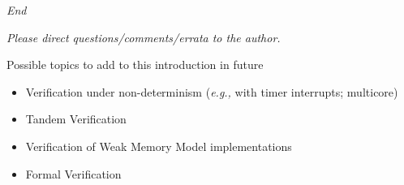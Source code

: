 \documentclass{article}
\newcommand{\eg}{\emph{e.g.,}}
\begin{document}
\begin{center}\Huge
  \vspace*{2in}

  \emph{End}

  \vspace*{2in}
  
  \begin{minipage}{7in}\Large
    \begin{center}
      \emph{Please direct questions/comments/errata to the author.}
    \end{center}
  \end{minipage}

\end{center}

\clearpage


\begin{center}
  {\Huge
    Possible topics to add to this introduction in future}

  \vspace*{1in}

  \begin{minipage}{9in}\LARGE
    \begin{itemize}
    \item Verification under non-determinism ({\eg} with timer interrupts; multicore)
    \item Tandem Verification
    \item Verification of Weak Memory Model implementations
    \item Formal Verification
    \end{itemize}
  \end{minipage}

\end{center}

\clearpage

\end{document}
